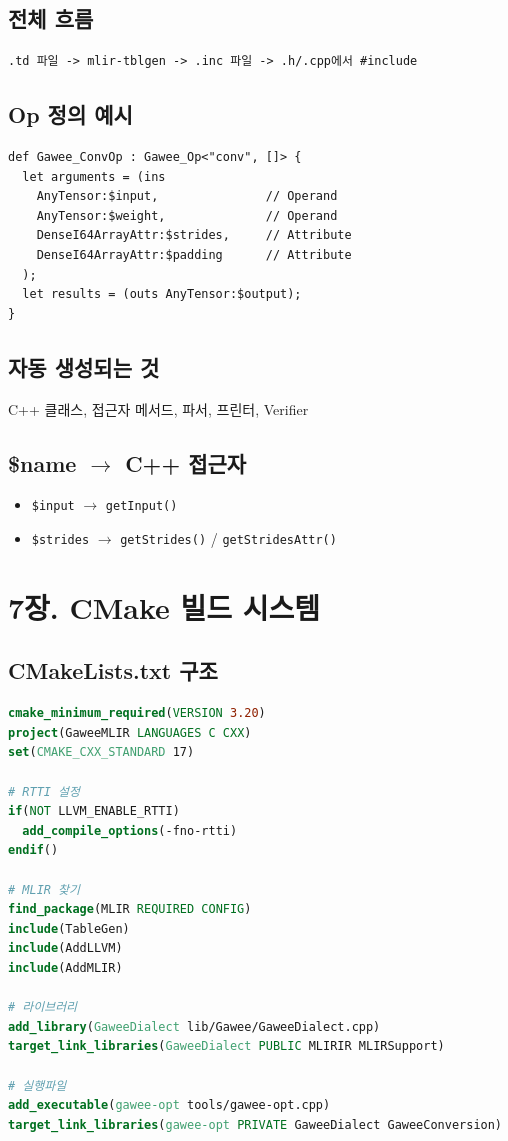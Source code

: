 \documentclass[11pt,a4paper]{article}
\begin{document}
\subsection{전체 흐름}
\begin{lstlisting}
.td 파일 -> mlir-tblgen -> .inc 파일 -> .h/.cpp에서 #include
\end{lstlisting}

\subsection{Op 정의 예시}
\begin{lstlisting}
def Gawee_ConvOp : Gawee_Op<"conv", []> {
  let arguments = (ins
    AnyTensor:$input,               // Operand
    AnyTensor:$weight,              // Operand
    DenseI64ArrayAttr:$strides,     // Attribute
    DenseI64ArrayAttr:$padding      // Attribute
  );
  let results = (outs AnyTensor:$output);
}
\end{lstlisting}

\subsection{자동 생성되는 것}
C++ 클래스, 접근자 메서드, 파서, 프린터, Verifier

\subsection{\$name $\to$ C++ 접근자}
\begin{itemize}[nosep]
\item \texttt{\$input} $\to$ \texttt{getInput()}
\item \texttt{\$strides} $\to$ \texttt{getStrides()} / \texttt{getStridesAttr()}
\end{itemize}

\newpage

\section{7장. CMake 빌드 시스템}

\subsection{CMakeLists.txt 구조}
\begin{lstlisting}[language=cmake]
cmake_minimum_required(VERSION 3.20)
project(GaweeMLIR LANGUAGES C CXX)
set(CMAKE_CXX_STANDARD 17)

# RTTI 설정
if(NOT LLVM_ENABLE_RTTI)
  add_compile_options(-fno-rtti)
endif()

# MLIR 찾기
find_package(MLIR REQUIRED CONFIG)
include(TableGen)
include(AddLLVM)
include(AddMLIR)

# 라이브러리
add_library(GaweeDialect lib/Gawee/GaweeDialect.cpp)
target_link_libraries(GaweeDialect PUBLIC MLIRIR MLIRSupport)

# 실행파일
add_executable(gawee-opt tools/gawee-opt.cpp)
target_link_libraries(gawee-opt PRIVATE GaweeDialect GaweeConversion)
\end{lstlisting}
\end{document}
